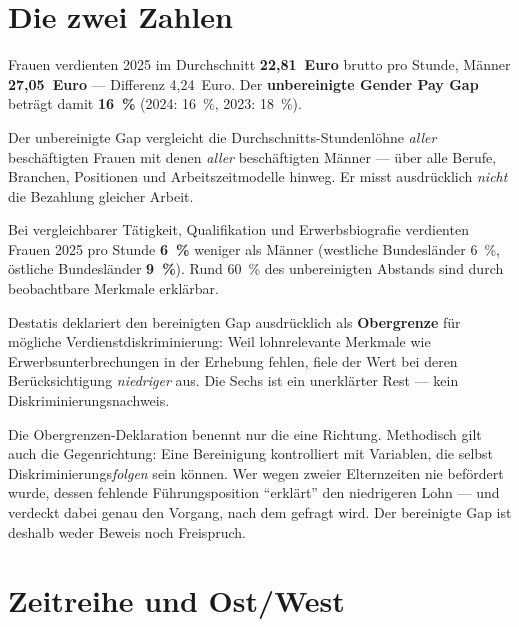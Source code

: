 \section{Die zwei Zahlen}

\begin{datenbox}
Frauen verdienten 2025 im Durchschnitt \textbf{22,81~Euro} brutto pro Stunde,
M\"anner \textbf{27,05~Euro} --- Differenz 4,24~Euro. Der \textbf{unbereinigte
Gender Pay Gap} betr\"agt damit \textbf{16~\%} (2024: 16~\%, 2023: 18~\%). \belegt
\end{datenbox}

Der unbereinigte Gap vergleicht die Durchschnitts-Stundenl\"ohne \emph{aller}
besch\"aftigten Frauen mit denen \emph{aller} besch\"aftigten M\"anner --- \"uber
alle Berufe, Branchen, Positionen und Arbeitszeitmodelle hinweg. Er misst
ausdr\"ucklich \emph{nicht} die Bezahlung gleicher Arbeit.

\begin{datenbox}
Bei vergleichbarer T\"atigkeit, Qualifikation und Erwerbsbiografie verdienten
Frauen 2025 pro Stunde \textbf{6~\%} weniger als M\"anner (westliche
Bundesl\"ander 6~\%, \"ostliche Bundesl\"ander \textbf{9~\%}). Rund 60~\% des
unbereinigten Abstands sind durch beobachtbare Merkmale erkl\"arbar. \belegt
\end{datenbox}

\begin{merksatz}
Destatis deklariert den bereinigten Gap ausdr\"ucklich als \textbf{Obergrenze}
f\"ur m\"ogliche Verdienstdiskriminierung: Weil lohnrelevante Merkmale wie
Erwerbsunterbrechungen in der Erhebung fehlen, fiele der Wert bei deren
Ber\"ucksichtigung \emph{niedriger} aus. Die Sechs ist ein unerkl\"arter Rest ---
kein Diskriminierungsnachweis.
\end{merksatz}

\begin{gegen}
Die Obergrenzen-Deklaration benennt nur die eine Richtung. Methodisch gilt auch
die Gegenrichtung: Eine Bereinigung kontrolliert mit Variablen, die selbst
Diskriminierungs\emph{folgen} sein k\"onnen. Wer wegen zweier Elternzeiten nie
bef\"ordert wurde, dessen fehlende F\"uhrungsposition \enquote{erkl\"art} den
niedrigeren Lohn --- und verdeckt dabei genau den Vorgang, nach dem gefragt wird.
Der bereinigte Gap ist deshalb weder Beweis noch Freispruch. \plausibel
\end{gegen}

\section{Zeitreihe und Ost/West}

